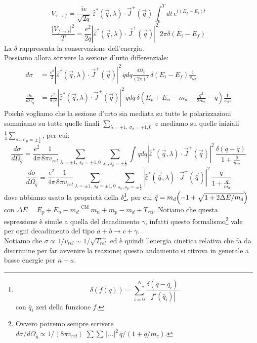 $$V_{i\to f} = \frac{ie}{\sqrt{2q}}\,\widehat{\varepsilon}^*(\vec{q},\lambda) \cdot \vec{J}^+(\vec{q})\, \int_0^T dt \, e^{i(E_f-E_i)t} $$
$$\frac{|V_{f\to i}|^2}{T} = \frac{e^2}{2q} |\widehat{\varepsilon}^*(\vec{q},\lambda) \cdot \vec{J}^+(\vec{q})|^2\, 2\pi \delta(E_i - E_f)$$
La $\delta$ rappresenta la conservazione dell'energia.\\
Possiamo allora scrivere la sezione d'urto differenziale:
\begin{displaymath}
\begin{aligned}
d\sigma &= \frac{e^2}{2} |\widehat{\varepsilon}^*(\vec{q},\lambda) \cdot \vec{J}^+(\vec{q})|^2\, q dq \frac{d\Omega_{\hat{q}}}{(2\pi)^2}\, \delta(E_i - E_f) \frac{1}{v_{rel}} \\
\frac{d\sigma}{d\Omega_{\hat{q}}} &= \frac{e^2}{8\pi^2} |\widehat{\varepsilon}^*(\vec{q},\lambda) \cdot \vec{J}^+(\vec{q})|^2\, q dq \, \delta(E_p + E_n - m_d - \frac{q^2}{2m_d}-q) \frac{1}{v_{rel}}
\end{aligned}
\end{displaymath}
Poiché vogliamo che la sezione d'urto sia mediata su tutte le polarizzazioni sommiamo su tutte quelle finali $\sum_{\lambda=\pm 1 ,\; \sigma_d = \pm 1, 0}$ e mediamo su quelle iniziali $\frac{1}{4}\sum_{\sigma_n,\sigma_p = \pm \frac{1}{2}}$, per cui:
$$\frac{d\sigma}{d\Omega_{\hat{q}}} = \frac{e^2}{4\pi}\frac{1}{8\pi v_{rel}}\sum_{\lambda=\pm 1 ,\; s_d = \pm 1, 0} \sum_{s_n,s_p = \pm \frac{1}{2}} \int q dq |\widehat{\varepsilon}^*(\vec{q},\lambda) \cdot \vec{J}^+(\vec{q})|^2\,\frac{\delta (q-\bar{q})}{1+\frac{\bar{q}}{m_d}}$$
$$\frac{d\sigma}{d\Omega_{\hat{q}}}=\frac{e^2}{4\pi}\frac{1}{8\pi v_{rel}}\sum_{\lambda=\pm 1 ,\; s_d = \pm 1, 0} \sum_{s_n,s_p = \pm \frac{1}{2}}  |\widehat{\varepsilon}^*(\vec{\bar{q}},\lambda) \cdot \vec{J}^+(\vec{\bar{q}})|^2\,\frac{\bar{q}}{1+\frac{\bar{q}}{m_d}}$$
dove abbiamo usato la proprietà della $\delta$\footnote{$$\delta (f(q)) = \sum_{i=0}^N\frac{\delta(q-\bar{q}_i)}{|f'(\bar{q}_i)|}$$
con $\bar{q}_i$ zeri della funzione $f$.}, per cui $\bar{q} = m_d \Bigl ( -1+ \sqrt{1+2\Delta E/m_d} \Bigr )$ con $\Delta E = E_p + E_n - m_d \overset{\text{CM}}{=} m_n+m_p-m_d + T_{rel}$. Notiamo che questa espressione è simile a quella del decadimento $\gamma$, infatti questo formalismo\footnote{Ovvero potremo sempre scrivere ${d\sigma}/{d\Omega_{\hat{q}}} \propto 1/(8\pi v_{rel})\; \sum \sum \, |\dots|^2\, {\bar{q}}/{(1+\bar{q}/m_c)}$.} vale per ogni decadimento del tipo $a+b\to c +\gamma$.\\
Notiamo che $\sigma \propto 1/v_{rel} \sim 1/\sqrt{T_{rel}}$ ed è quindi l'energia cinetica relativa che fa da discrimine per far avvenire la reazione; questo andamento si ritrova in generale a basse energie per $n+a$.

